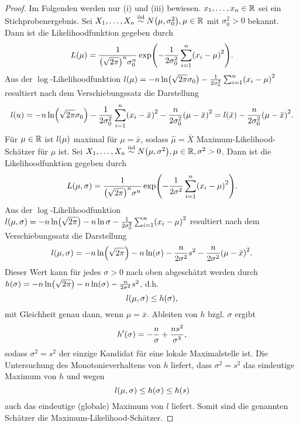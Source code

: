 \documentclass{lecture}
\begin{document}
    \begin{proof}
        Im Folgenden werden nur (i) und (iii) bewiesen.
        \(x_1, \ldots, x_n \in \mathbb{R}\) sei ein Stichprobenergebnis.
        Sei \(X_1, \ldots, X_n \stackrel{\text{iid}}{\sim} N\parentheses*{\mu, \sigma_0^2}, \mu \in \R\) mit \(\sigma_0^2 > 0\) bekannt.
        Dann ist die Likelihoodfunktion gegeben durch
        \[
            L\parentheses*{\mu} = \frac{1}{\parentheses*{\sqrt{2\pi}}^n \sigma_0^n}\exp\parentheses*{-\frac{1}{2\sigma_0^2}\sum_{i = 1}^n \parentheses*{x_i - \mu}^2}.
        \]
        Aus der \(\log\)-Likelihoodfunktion \(l\parentheses*{\mu} = -n\ln\parentheses*{\sqrt{2\pi}\sigma_0} - \frac{1}{2\sigma_0^2}\sum_{i = 1}^n \parentheses*{x_i - \mu}^2\) resultiert nach dem Verschiebungssatz die Darstellung
        \[
            l\parentheses*{u} = -n\ln\parentheses*{\sqrt{2\pi}\sigma_0} - \frac{1}{2\sigma_0^2}\sum_{i = 1}^n \parentheses*{x_i - \bar{x}}^2 - \frac{n}{2\sigma_0^2}\parentheses*{\mu - \bar{x}}^2 = l\parentheses*{\bar{x}} - \frac{n}{2\sigma_0^2}\parentheses*{\mu - \bar{x}}^2.
        \]
        Für \(\mu \in \mathbb{R}\) ist \(l\parentheses*{\mu}\) maximal für \(\mu = \bar{x}\), sodass \(\hat{\mu} = \bar{X}\) Maximum-Likelihood-Schätzer für \(\mu\) ist.
        Sei \(X_1, \ldots, X_n \stackrel{\text{iid}}{\sim} N\parentheses*{\mu, \sigma^2}, \mu \in \R, \sigma^2 > 0\).
        Dann ist die Likelihoodfunktion gegeben durch
        \[
            L\parentheses*{\mu, \sigma} = \frac{1}{\parentheses*{\sqrt{2\pi}}^n \sigma^n}\exp\parentheses*{-\frac{1}{2\sigma^2}\sum_{i = 1}^n \parentheses*{x_i - \mu}^2}.
        \]
        Aus der \(\log\)-Likelihoodfunktion \(l\parentheses*{\mu, \sigma} = -n\ln\parentheses*{\sqrt{2\pi}} - n\ln\sigma - \frac{1}{2\sigma_0^2}\sum_{i = 1}^n \parentheses*{x_i - \mu}^2\) resultiert nach dem Verschiebungssatz die Darstellung
        \[
            l\parentheses*{\mu, \sigma} = -n\ln\parentheses*{\sqrt{2\pi}} - n\ln\parentheses*{\sigma} - \frac{n}{2\sigma^2}s^2 - \frac{n}{2\sigma^2}\parentheses*{\mu - \bar{x}}^2.
        \]
        Dieser Wert kann für jedes \(\sigma > 0\) nach oben abgeschätzt werden durch \(h\parentheses*{\sigma} = -n\ln\parentheses*{\sqrt{2\pi}} - n\ln\parentheses*{\sigma} - \frac{n}{2\sigma^2}s^2\), d.h.
        \[
            l\parentheses*{\mu, \sigma} \le h\parentheses*{\sigma},
        \]
        mit Gleichheit genau dann, wenn \(\mu = \bar{x}\).
        Ableiten von \(h\) bzgl. \(\sigma\) ergibt
        \[
            h'\parentheses*{\sigma} = -\frac{n}{\sigma} + \frac{ns^2}{\sigma^3},
        \]
        sodass \(\sigma^2 = s^2\) der einzige Kandidat für eine lokale Maximalstelle ist.
        Die Untersuchung des Monotonieverhaltens von \(h\) liefert, dass \(\sigma^2 = s^2\) das eindeutige Maximum von \(h\) und wegen
        \[
            l\parentheses*{\mu, \sigma} \le h\parentheses*{\sigma} \le h\parentheses*{s}
        \]
        auch das eindeutige (globale) Maximum von \(l\) liefert.
        Somit sind die genannten Schätzer die Maximum-Likelihood-Schätzer.
    \end{proof}
    
\end{document}
